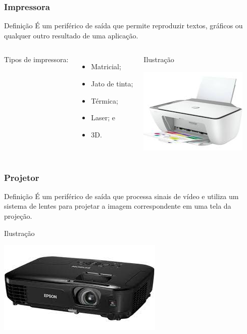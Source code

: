 \documentclass[aspectratio=169]{beamer} %
\begin{document}
\begin{frame}
	\frametitle{Impressora}
	
	\begin{block}{Defini\c cão}
		É um periférico de saída que permite reproduzir textos, gráficos ou qualquer outro resultado de uma aplicação.
	\end{block}\vfill	
	
	\begin{columns}
		Tipos de impressora:
		\begin{itemize}
			\item Matricial;
			\item Jato de tinta;
			\item Térmica;
			\item Laser; e
			\item 3D.
		\end{itemize}


		\begin{exampleblock}{Ilustra\c cão}
			\begin{center}
				\includegraphics[scale=0.5]{img/impressora}
			\end{center}		
		\end{exampleblock}
	\end{columns}
\end{frame}

\begin{frame}
	\frametitle{Projetor}
	
	\begin{block}{Defini\c cão}
		É um periférico de saída que processa sinais de vídeo e utiliza um sistema de lentes para projetar a imagem correspondente em uma tela da projeção.
	\end{block}\vfill
	
	\begin{exampleblock}{Ilustra\c cão}
		\begin{center}
			\includegraphics[scale=0.5]{img/projetor}
		\end{center}		
	\end{exampleblock}
\end{frame}
\end{document}
